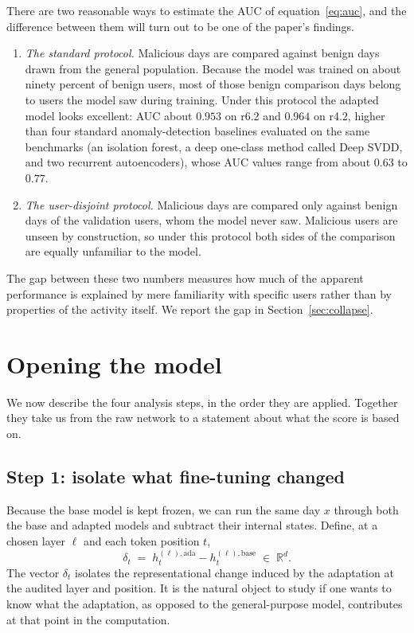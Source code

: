 \documentclass[10pt]{article}
\begin{document}
There are two reasonable ways to estimate the AUC of
equation~\eqref{eq:auc}, and the difference between them will turn out
to be one of the paper's findings.
\begin{enumerate}
\item \emph{The standard protocol.} Malicious days are compared against
benign days drawn from the general population. Because the model was
trained on about ninety percent of benign users, most of those benign
comparison days belong to users the model saw during training. Under
this protocol the adapted model looks excellent: AUC about $0.953$ on
r6.2 and $0.964$ on r4.2, higher than four standard anomaly-detection
baselines evaluated on the same benchmarks (an isolation forest, a
deep one-class method called Deep SVDD, and two
recurrent autoencoders), whose AUC values range from about $0.63$ to
$0.77$.
\item \emph{The user-disjoint protocol.} Malicious days are compared
only against benign days of the validation users, whom the model never
saw. Malicious users are unseen by construction, so under this protocol
both sides of the comparison are equally unfamiliar to the model.
\end{enumerate}
The gap between these two numbers measures how much of the apparent
performance is explained by mere familiarity with specific users rather
than by properties of the activity itself. We report the gap in
Section~\ref{sec:collapse}.

\section{Opening the model}
\label{sec:method}

We now describe the four analysis steps, in the order they are applied.
Together they take us from the raw network to a statement about what
the score is based on.

\subsection{Step 1: isolate what fine-tuning changed}

Because the base model is kept frozen, we can run the same day $x$
through both the base and adapted models and subtract their internal
states. Define, at a chosen layer $\ell$ and each token position $t$,
\begin{equation}
\delta_t \;=\; h^{(\ell), \mathrm{ada}}_t - h^{(\ell),
\mathrm{base}}_t \;\in\; \mathbb{R}^{d}.
\end{equation}
The vector $\delta_t$ isolates the representational change induced by
the adaptation at the audited layer and position. It is the natural
object to study if one wants to know what the adaptation, as opposed to
the general-purpose model, contributes at that point in the
computation.
\end{document}
